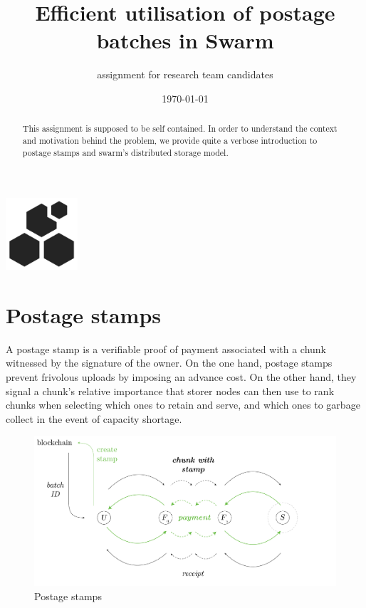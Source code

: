 
\title{Efficient utilisation of postage batches in Swarm}


\author{assignment for research team candidates}
\date{\today}

\maketitle
\vspace{.5cm}
\begin{center}
\includegraphics[width=0.2\textwidth]{fig/logo.pdf}
\end{center}
\vspace{1.5cm}

\maketitle
\begin{abstract}
    This assignment is supposed to be self contained. In order to understand the context and motivation behind the problem, we provide quite a verbose introduction to postage stamps and swarm's distributed storage model.
\end{abstract}
\tableofcontents
\newpage
\section{Postage stamps}\label{sec:postage-stamps}

A postage stamp is a verifiable proof of payment associated with a chunk witnessed by the signature of the owner. On the one hand, postage stamps  prevent frivolous uploads by imposing an advance cost. On the other hand, they signal a chunk's relative importance that storer nodes can then use to rank chunks when selecting which ones to retain and serve, and which ones to garbage collect in the event of capacity shortage.


\begin{figure}[htbp]
\centering
  \includegraphics[width=\textwidth]{fig/postage-stamp.pdf}
\caption[Postage stamps]{Postage stamps}
\label{fig:postage-stamps}
\end{figure}

